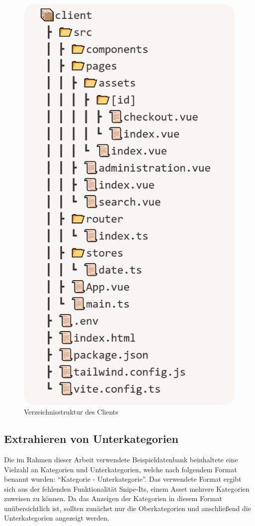 \begin{figure}[h]
  \centering
  \includegraphics[scale=0.3]{Bilder/verzeichnisfront.png}
  \caption{Verzeichnisstruktur des Clients}
  \label{fig:vue}
\end{figure}

\subsection{Extrahieren von Unterkategorien}
Die im Rahmen dieser Arbeit verwendete Beispieldatenbank beinhaltete eine Vielzahl an Kategorien und
Unterkategorien, welche nach folgendem Format benannt wurden: \enquote{Kategorie - Unterkategorie}.
Das verwendete Format ergibt sich aus der fehlenden Funktionalität Snipe-Its, einem Asset mehrere
Kategorien zuweisen zu können. Da das Anzeigen der Kategorien in diesem Format unübersichtlich ist,
sollten zunächst nur die Oberkategorien und anschließend die Unterkategorien angezeigt werden.

